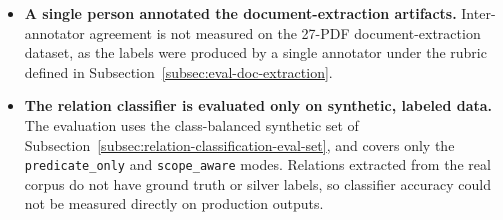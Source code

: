 \begin{itemize}[label={},leftmargin=1.5em]
    \item \textbf{A single person annotated the document-extraction artifacts.} Inter-annotator agreement is not measured on the 27-PDF document-extraction dataset, as the labels were produced by a single annotator under the rubric defined in Subsection~\ref{subsec:eval-doc-extraction}.

    \item \textbf{The relation classifier is evaluated only on synthetic, labeled data.} The evaluation uses the class-balanced synthetic set of Subsection~\ref{subsec:relation-classification-eval-set}, and covers only the \texttt{predicate\_only} and \texttt{scope\_aware} modes. Relations extracted from the real corpus do not have ground truth or silver labels, so classifier accuracy could not be measured directly on production outputs.
\end{itemize}